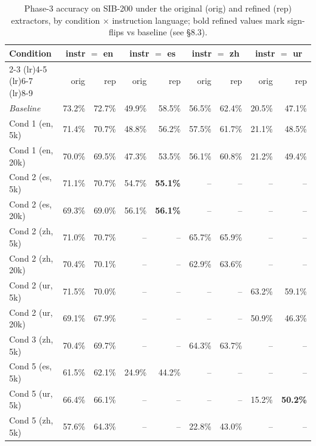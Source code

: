 \begin{table}[t]
  \centering
  \small
  \begin{tabular}{lrrrrrrrr}
    \toprule
    Condition & \multicolumn{2}{c}{instr $=$ en} & \multicolumn{2}{c}{instr $=$ es} & \multicolumn{2}{c}{instr $=$ zh} & \multicolumn{2}{c}{instr $=$ ur} \\
    \cmidrule(lr){2-3} \cmidrule(lr){4-5} \cmidrule(lr){6-7} \cmidrule(lr){8-9}
     & orig & rep & orig & rep & orig & rep & orig & rep \\
    \midrule
    \textit{Baseline} & 73.2\% & 72.7\% & 49.9\% & 58.5\% & 56.5\% & 62.4\% & 20.5\% & 47.1\% \\
    Cond 1 (en, 5k) & 71.4\% & 70.7\% & 48.8\% & 56.2\% & 57.5\% & 61.7\% & 21.1\% & 48.5\% \\
    Cond 1 (en, 20k) & 70.0\% & 69.5\% & 47.3\% & 53.5\% & 56.1\% & 60.8\% & 21.2\% & 49.4\% \\
    Cond 2 (es, 5k) & 71.1\% & 70.7\% & 54.7\% & \textbf{55.1\%} & -- & -- & -- & -- \\
    Cond 2 (es, 20k) & 69.3\% & 69.0\% & 56.1\% & \textbf{56.1\%} & -- & -- & -- & -- \\
    Cond 2 (zh, 5k) & 71.0\% & 70.7\% & -- & -- & 65.7\% & 65.9\% & -- & -- \\
    Cond 2 (zh, 20k) & 70.4\% & 70.1\% & -- & -- & 62.9\% & 63.6\% & -- & -- \\
    Cond 2 (ur, 5k) & 71.5\% & 70.0\% & -- & -- & -- & -- & 63.2\% & 59.1\% \\
    Cond 2 (ur, 20k) & 69.1\% & 67.9\% & -- & -- & -- & -- & 50.9\% & 46.3\% \\
    Cond 3 (zh, 5k) & 70.4\% & 69.7\% & -- & -- & 64.3\% & 63.7\% & -- & -- \\
    Cond 5 (es, 5k) & 61.5\% & 62.1\% & 24.9\% & 44.2\% & -- & -- & -- & -- \\
    Cond 5 (ur, 5k) & 66.4\% & 66.1\% & -- & -- & -- & -- & 15.2\% & \textbf{50.2\%} \\
    Cond 5 (zh, 5k) & 57.6\% & 64.3\% & -- & -- & 22.8\% & 43.0\% & -- & -- \\
    \bottomrule
  \end{tabular}
  \caption{Phase-3 accuracy on \textsc{SIB-200} under the original (orig) and refined (rep) extractors, by condition $\times$ instruction language; bold refined values mark sign-flips vs baseline (see \S8.3).}
  \label{tab:t3-sib200}
\end{table}

